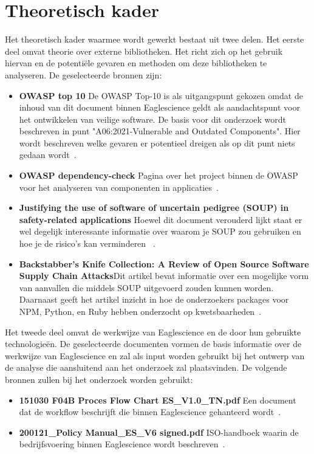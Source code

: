 \section{Theoretisch kader}\label{sec:theoretisch-kader}
Het theoretisch kader waarmee wordt gewerkt bestaat uit twee delen. Het eerste deel omvat theorie over externe bibliotheken. Het richt zich op het gebruik hiervan en de potentiële gevaren en methoden om deze bibliotheken te analyseren. De geselecteerde bronnen zijn:
\begin{itemize}
    \item \textbf{OWASP top 10}
    De OWASP Top-10 is als uitgangspunt gekozen omdat de inhoud van dit document binnen Eaglescience geldt als aandachtspunt voor het ontwikkelen van veilige software. De basis voor dit onderzoek wordt beschreven in punt "A06:2021-Vulnerable and Outdated Components". Hier wordt beschreven welke gevaren er potentieel dreigen als op dit punt niets gedaan wordt~\citep{OWASP:2021}.
    \item \textbf{OWASP dependency-check} Pagina over het project binnen de OWASP voor het analyseren van componenten in applicaties~\citep{OWASP:2017}.
    \item \textbf{Justifying the use of software of uncertain pedigree (SOUP) in safety-related applications} Hoewel dit document verouderd lijkt staat er wel degelijk interessante informatie over waarom je SOUP zou gebruiken en hoe je de risico's kan verminderen~\citep{Bischop:2001} .
    \item \textbf{Backstabber’s Knife Collection: A Review of Open Source Software Supply Chain Attacks}Dit artikel bevat informatie over een mogelijke vorm van aanvallen die middels SOUP uitgevoerd zouden kunnen worden. Daarnaast geeft het artikel inzicht in hoe de onderzoekers packages voor NPM, Python, en Ruby hebben onderzocht op kwetsbaarheden~\citep{Ohm:2020}.
\end{itemize}
Het tweede deel omvat de werkwijze van Eaglescience en de door hun gebruikte technologieën. De geselecteerde documenten vormen de basis informatie over de werkwijze van Eaglescience en zal als input worden gebruikt bij het ontwerp van de analyse die aansluitend aan het onderzoek zal plaatsvinden. De volgende bronnen zullen bij het onderzoek worden gebruikt:
\begin{itemize}
    \item \textbf{151030 F04B Proces Flow Chart ES\_V1.0\_TN.pdf} Een document dat de workflow beschrijft die binnen Eaglescience gehanteerd wordt~\citep{Eaglescience:2015}.
    \item \textbf{200121\_Policy Manual\_ES\_V6 signed.pdf} ISO-handboek waarin de bedrijfsvoering binnen Eaglescience wordt beschreven~\citep{Eaglescience:2020}.
\end{itemize}

